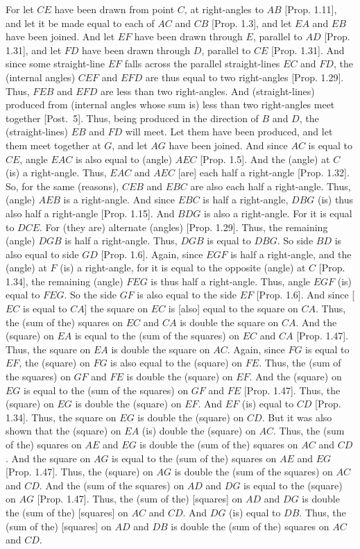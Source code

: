 \begin{Parallel}{}{}
{For let $CE$ have been drawn from point $C$, at right-angles to $AB$ [Prop. 1.11],
and let it be made equal to each of $AC$ and $CB$ [Prop. 1.3], and let $EA$ and
$EB$ have been joined. And let $EF$ have been drawn through $E$, parallel to $AD$
[Prop. 1.31], and let $FD$ have been drawn through $D$, parallel to $CE$ [Prop. 1.31]. And since some straight-line $EF$ falls across the parallel straight-lines $EC$ and $FD$, the (internal angles) $CEF$ and $EFD$ are thus equal
to two right-angles [Prop. 1.29]. Thus, $FEB$ and $EFD$ are less than two
right-angles. And (straight-lines) produced from (internal angles whose sum is) less than
two right-angles meet together [Post.~5]. Thus, being produced in the direction of $B$
and $D$, the (straight-lines) $EB$ and $FD$ will meet. Let them have been 
produced,
and let them meet together at $G$, and let $AG$ have been joined.
And since $AC$ is equal to $CE$, angle $EAC$ is also equal to (angle) $AEC$ [Prop. 1.5]. And the (angle) at $C$ (is) a right-angle. Thus, $EAC$ and $AEC$
[are] each half a right-angle [Prop. 1.32]. So, for the same (reasons), $CEB$ and $EBC$ are
also each half a right-angle. Thus, (angle) $AEB$ is a right-angle.
And since $EBC$ is half a right-angle, $DBG$ (is) thus also half a right-angle
[Prop. 1.15]. And $BDG$ is also a right-angle. For it is equal to $DCE$.
For (they are) alternate (angles) [Prop. 1.29].
Thus, the remaining (angle) $DGB$ is half a right-angle. Thus,
$DGB$ is equal to $DBG$. So side $BD$ is also equal to side $GD$ [Prop. 1.6].
Again, 
since $EGF$ is  half a right-angle, and the (angle) at $F$ (is) a right-angle,
for it is equal to the opposite (angle) at $C$
[Prop. 1.34], the remaining
(angle) $FEG$ is thus half a right-angle. Thus, angle $EGF$ (is) equal to $FEG$.
So the side $GF$ is also equal to the side $EF$ [Prop. 1.6].
And since [$EC$ is equal to $CA$] the square on $EC$ is [also] equal to the
square on $CA$. Thus, the (sum of the) squares on $EC$ and $CA$ is 
double the square on $CA$. And the (square) on $EA$ is equal to the (sum of the
squares) on $EC$ and $CA$ [Prop. 1.47]. Thus, the square on $EA$ is double the
square on $AC$. Again, since $FG$ is equal to $EF$, the (square) on $FG$ is also
equal to the (square) on $FE$. Thus, the (sum of the squares) on $GF$ and
$FE$ is double the (square) on $EF$. And the (square) on $EG$ is equal to
the (sum of the squares) on  $GF$ and $FE$ [Prop. 1.47]. Thus, the (square)
on $EG$ is double the (square) on $EF$. And $EF$ (is) equal to $CD$  [Prop. 1.34].
Thus, the square on $EG$ is double the (square) on $CD$. But it was also
shown that the (square) on $EA$ (is) double the (square) on $AC$. Thus,
the (sum of the) squares on $AE$ and $EG$ is double the (sum of the) squares
on $AC$ and $CD$. And the square on $AG$ is equal to the (sum of the) squares
on $AE$ and $EG$ [Prop. 1.47]. Thus, the (square) on $AG$ is double the (sum of the squares) on $AC$ and $CD$. And the (sum of the squares) on $AD$ and $DG$ 
is equal to the (square) on $AG$  [Prop. 1.47].
Thus, the (sum of the) [squares] on $AD$ and $DG$ is double the
(sum of the) [squares] on $AC$ and $CD$. And $DG$ (is) equal to $DB$.
Thus, the (sum of the) [squares] on $AD$ and $DB$ is double the
(sum of the) squares on $AC$ and $CD$. 

}
\end{Parallel}
